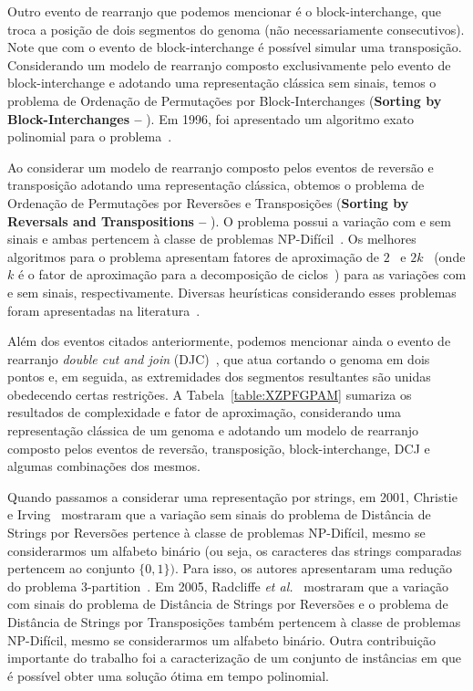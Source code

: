 Outro evento de rearranjo que podemos mencionar é o block-interchange, que troca a posição de dois segmentos do genoma (não necessariamente consecutivos). Note que com o evento de block-interchange é possível simular uma transposição. Considerando um modelo de rearranjo composto exclusivamente pelo evento de block-interchange e adotando uma representação clássica sem sinais, temos o problema de Ordenação de Permutações por Block-Interchanges (\textbf{Sorting by Block-Interchanges --} \SbBI). Em 1996, foi apresentado um algoritmo exato polinomial para o problema~\cite{1996-christie}.

Ao considerar um modelo de rearranjo composto pelos eventos de reversão e transposição adotando uma representação clássica, obtemos o problema de Ordenação de Permutações por Reversões e Transposições (\textbf{Sorting by Reversals and Transpositions --} \SbRT). O problema possui a variação com e sem sinais e ambas pertencem à classe de problemas NP-Difícil~\cite{2019b-oliveira-etal}. Os melhores algoritmos para o problema apresentam fatores de aproximação de $2$~\cite{1998-walter-etal} e $2k$~\cite{2008-rahman-etal} (onde $k$ é o fator de aproximação para a decomposição de ciclos~\cite{2013-chen}) para as variações com e sem sinais, respectivamente. Diversas heurísticas considerando esses problemas foram apresentadas na literatura~\cite{2014a-dias-etal,2018-brito-etal}.

Além dos eventos citados anteriormente, podemos mencionar ainda o evento de rearranjo \emph{double cut and join} (DJC)~\cite{2005-yancopoulos-etal}, que atua cortando o genoma em dois pontos e, em seguida, as extremidades dos segmentos resultantes são unidas obedecendo certas restrições. A Tabela~\ref{table:XZPFGPAM} sumariza os resultados de complexidade e fator de aproximação, considerando uma representação clássica de um genoma e adotando um modelo de rearranjo composto pelos eventos de reversão, transposição, block-interchange, DCJ e algumas combinações dos mesmos. 



Quando passamos a considerar uma representação por strings, em 2001, Christie e Irving~\cite{2001-christie-irving} mostraram que a variação sem sinais do problema de Distância de Strings por Reversões pertence à classe de problemas NP-Difícil, mesmo se considerarmos um alfabeto binário (ou seja, os caracteres das strings comparadas pertencem ao conjunto $\{0,1\})$. Para isso, os autores apresentaram uma redução do problema 3-partition~\cite{1990-garey-johnson}. Em 2005, Radcliffe \textit{et al.}~\cite{2005-radcliffe-etal} mostraram que a variação com sinais do problema de Distância de Strings por Reversões e o problema de Distância de Strings por Transposições também pertencem à classe de problemas NP-Difícil, mesmo se considerarmos um alfabeto binário. Outra contribuição importante do trabalho foi a caracterização de um conjunto de instâncias em que é possível obter uma solução ótima em tempo polinomial.

